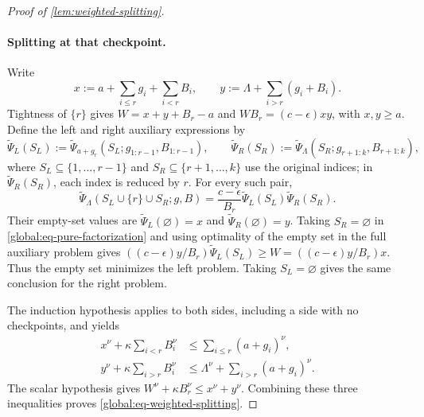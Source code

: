 \documentclass[10pt,a4paper]{amsart}
\begin{document}
\begin{proof}[Proof of \cref{lem:weighted-splitting}]
\paragraph{Splitting at that checkpoint.}
Write
\[
  x:=a+\sum_{i\le r}g_i+\sum_{i<r}B_i,
  \qquad y:=\Lambda+\sum_{i>r}(g_i+B_i).
\]
Tightness of $\{r\}$ gives $W=x+y+B_r-a$ and $WB_r=(c-\epsilon) xy$, with $x,y\ge a$.
Define the left and right auxiliary expressions by
\[
  \widetilde\Psi_L(S_L):=\widetilde\Psi_{a+g_r}(S_L;g_{1:r-1},B_{1:r-1}),
  \qquad
  \widetilde\Psi_R(S_R):=\widetilde\Psi_\Lambda(S_R;g_{r+1:k},B_{r+1:k}),
\]
where $S_L\subseteq\{1,\ldots,r-1\}$ and $S_R\subseteq\{r+1,\ldots,k\}$ use the original indices; in $\widetilde\Psi_R(S_R)$, each index is reduced by $r$.
For every such pair,
\begin{equation}
  \widetilde\Psi_\Lambda(S_L\cup\{r\}\cup S_R;g,B)
  =\frac{c-\epsilon}{B_r}\widetilde\Psi_L(S_L)\widetilde\Psi_R(S_R).
  \label{global:eq-pure-factorization}
\end{equation}
Their empty-set values are $\widetilde\Psi_L(\varnothing)=x$ and $\widetilde\Psi_R(\varnothing)=y$.
Taking $S_R=\varnothing$ in \eqref{global:eq-pure-factorization} and using optimality of the empty set in the full auxiliary problem gives $((c-\epsilon) y/B_r)\widetilde\Psi_L(S_L)\ge W=((c-\epsilon) y/B_r)x$.
Thus the empty set minimizes the left problem.
Taking $S_L=\varnothing$ gives the same conclusion for the right problem.

The induction hypothesis applies to both sides, including a side with no checkpoints, and yields
\begin{align*}
  x^\nu+\kappa\sum_{i<r}B_i^\nu
    &\le\sum_{i\le r}(a+g_i)^\nu,\\
  y^\nu+\kappa\sum_{i>r}B_i^\nu
    &\le\Lambda^\nu+\sum_{i>r}(a+g_i)^\nu.
\end{align*}
The scalar hypothesis gives $W^\nu+\kappa B_r^\nu\le x^\nu+y^\nu$.
Combining these three inequalities proves \eqref{global:eq-weighted-splitting}.
\end{proof}
\end{document}
